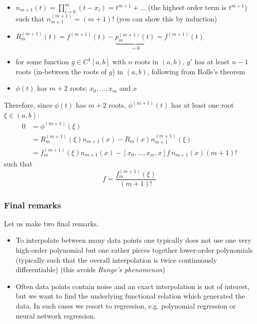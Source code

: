 \begin{itemize}
    \item $n_{m+1}(t) = \prod_{i = 0}^{m} (t - x_i) = t^{m+1} + \dots$ (the highest order term is $t^{m+1}$) such that $n_{m+1}^{(m+1)} = (m+1)!$ 
    (you can show this by induction)
    \item $R_m^{(m+1)}(t) = f^{(m+1)}(t) - \underbrace{p_m^{(m+1)}(t)}_{=0} = f^{(m+1)}(t)$
    \item for some function $g \in C^{1}[a,b]$ with $n$ roots in $(a,b)$, $g'$ has at least $n-1$ roots
    (in-between the roots of $g$) in $(a,b)$, following from Rolle's theorem
    \item $\phi(t)$ has $m+2$ roots: $x_0,...,x_m$ and $x$
\end{itemize}
Therefore, since $\phi(t)$ has $m+2$ roots, $\phi^{(m+1)}(t)$ has at least one root $\xi \in (a,b)$:
\begin{equation}
    \begin{aligned}
        0 &= \phi^{(m+1)}(\xi) \\
          &= R^{(m+1)}_m(\xi) n_{m+1}(x) - R_m(x) n^{(m+1)}_{m+1}(\xi) \\
          & = f^{(m+1)}_m(\xi) n_{m+1}(x) - [x_0,...,x_m,x] f \, n_{m+1}(x) (m+1)!
    \end{aligned}
\end{equation}
such that
\begin{equation}
    [x_0,...,x_m,x] f = \frac{f^{(m+1)}_m(\xi)}{(m+1)!}
\end{equation}

\subsubsection{Final remarks}

Let us make two final remarks.

\begin{itemize}
    \item To interpolate between many data points one typically does not use 
    one very high-order polynomial but one rather pieces together lower-order polynomials
    (typically such that the overall interpolation is twice continuously differentiable) (this avoids \textit{Runge's phenomenon})
    \item Often data points contain noise and an exact interpolation is not of interest, but we want to find the underlying functional
    relation which generated the data. In such cases we resort to regression, e.g. polynomial regression or neural network regression.
\end{itemize}

\pagebreak